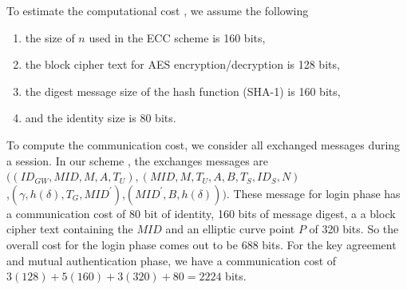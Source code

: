 \documentclass[a4paper,12pt]{report}
\begin{document}
\begin{table}[h]
\centering
{}
\caption{The execution time of cryptographic operations}
\label{table:2}
\end{table}
To estimate the computational cost , we assume the following
\begin{enumerate}
\item the size of $n$ used in the ECC scheme is 160 bits,
\item the block cipher text for AES encryption/decryption is 128 bits,
\item the digest message size of the hash function (SHA-1) is 160 bits,
\item and the identity size is 80 bits.
\end{enumerate}
To compute the communication cost, we consider all exchanged
messages during a session. In our scheme , the exchanges messages
are $((ID_{GW},MID, M,A,T_U),(MID,M,T_U,
A,B,T_S,ID_S,N)$\\,$(\gamma,h(\delta),T_G,MID^{\prime})$,$(MID^{\prime},B,h(\delta)))$.
These message for login phase has a communication cost of 80 bit of
identity, 160 bits of message digest, a a block cipher text
containing the $MID$ and an elliptic curve point $P$ of 320 bits. So
the overall cost for the login phase comes out to be $688$ bits. For
the key agreement and mutual authentication phase, we have a
communication cost of $ 3(128) + 5(160) +3(320) + 80 = 2224$ bits.
\end{document}
